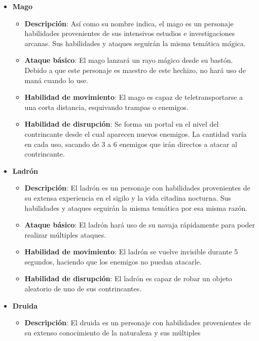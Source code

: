 \begin{itemize}
    \item \textbf{Mago}
    \begin{itemize}
        \item \textbf{Descripción}: Así como su nombre indica, el mago es un personaje
        habilidades provenientes de sus intensivos estudios e
        investigaciones arcanas. Sus habilidades y ataques seguirán la misma
        temática mágica.
        \item \textbf{Ataque básico}: El mago lanzará un rayo mágico desde su bastón.
        Debido a que este personaje es maestro de este hechizo, no hará uso de
        maná cuando lo use.
        \item \textbf{Habilidad de movimiento}: El mago es capaz de teletransportarse a
        una corta distancia, esquivando trampas o enemigos.
        \item \textbf{Habilidad de disrupción}: Se forma un portal en el nivel del
        contrincante desde el cual aparecen nuevos enemigos. La cantidad varía
        en cada uso, sacando de 3 a 6 enemigos que irán directos a atacar al
        contrincante.
    \end{itemize}
    \item \textbf{Ladrón}
    \begin{itemize}
        \item \textbf{Descripción}: El ladrón es un personaje con habilidades
        provenientes de su extensa experiencia en el sigilo y la vida citadina
        nocturna. Sus habilidades y ataques seguirán la misma temática por esa
        misma razón.
        \item \textbf{Ataque básico}: El ladrón hará uso de su navaja rápidamente para
        poder realizar múltiples ataques.
        \item \textbf{Habilidad de movimiento}: El ladrón se vuelve invisible durante 5
        segundos, haciendo que los enemigos no puedan atacarle.
        \item \textbf{Habilidad de disrupción}: El ladrón es capaz de robar un objeto
        aleatorio de uno de sus contrincantes.
    \end{itemize}
    \item \textbf{Druida}
    \begin{itemize}
        \item \textbf{Descripción}: El druida es un personaje con habilidades
        provenientes de su extenso conocimiento de la naturaleza y sus múltiples

\end{itemize}
\end{itemize}

